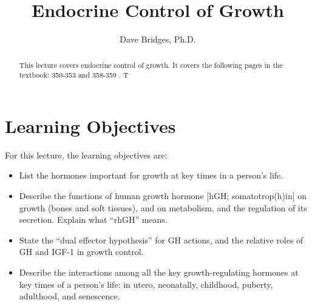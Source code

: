 \documentclass{tufte-handout}
\title{Endocrine Control of Growth}
\author{Dave Bridges, Ph.D.}
\begin{document}
\maketitle%

\begin{abstract}
\noindent This lecture covers endocrine control of growth.  It covers the following pages in the textbook: 350-353 and 358-359 \cite{Widmaier2013}.  T
\end{abstract}

\tableofcontents

\pagebreak

\section{Learning Objectives}
For this lecture, the learning objectives are:
\begin{itemize}
\item List the hormones important for growth at key times in a person’s life.
\item Describe the functions of human growth hormone [hGH; somatotrop(h)in] on growth (bones and soft tissues), and on metabolism, and the regulation of its secretion.  Explain what “rhGH” means.
\item State the “dual effector hypothesis” for GH actions, and the relative roles of GH and IGF-1 in growth control. 
\item Describe the interactions among all the key growth-regulating hormones at key times of a person’s life: in utero, neonatally, childhood, puberty, adulthood, and senescence.

\end{itemize}



\listoffigures
\listoftables



\end{document}
